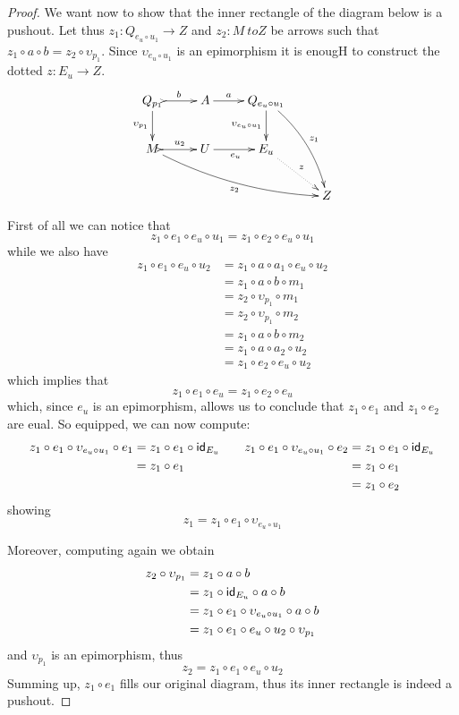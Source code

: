 \begin{proof}
	We want now to show that the inner rectangle of the diagram below is a pushout.  Let thus $z_1\colon Q_{e_u\circ u_1}\to Z$ and $z_2\colon M\ to Z$ be arrows such that $z_1\circ a\circ b=z_2\circ \upsilon_{p_1}$. Since $\upsilon_{e_u\circ u_1}$ is an epimorphism it is enougH to construct the dotted $z\colon E_u \to Z$. 
	\[\xymatrix{Q_{p_1} \ar@{>->}[r]^{b} \ar[d]_{\upsilon_{p_1}}& A \ar[r]^-{a}& Q_{e_u\circ u_1} \ar[d]_{\upsilon_{e_u\circ u_1}} \ar@/^.3cm/[ddr]^{z_1} \\M \ar@/_.3cm/[drrr]_{z_2}\ar@{>->}[r]^-{u_2}&U \ar[r]_{e_u}& E_u \ar@{.>}[dr]^{z}\\ & & & Z}\]
	
	First of all we can notice that
	\[z_1\circ e_1\circ e_u\circ u_1 = z_1\circ e_2\circ e_u\circ u_1\]
	while we also have
	\begin{align*}
		z_1\circ e_1\circ e_u\circ u_2 &= z_1\circ a\circ a_1\circ e_u\circ u_2\\&=z_1\circ a \circ b\circ m_1\\&=z_2\circ \upsilon_{p_1} \circ m_1
		\\&=z_2\circ \upsilon_{p_1} \circ m_2
		\\&=z_1\circ a \circ b\circ m_2 
		\\&=z_1\circ a\circ a_2\circ u_2
		\\&=z_1\circ e_2\circ e_u \circ u_2
	\end{align*}
	which implies that
	\[z_1\circ e_1\circ e_u  = z_1\circ e_2\circ e_u\]
	which, since $e_u$ is an epimorphism, allows us to conclude that $z_1\circ e_1$ and $z_1\circ e_2$ are eual. So equipped, we can now compute:
	\[\begin{split}
		z_1\circ e_1\circ \upsilon_{e_u\circ u_1}\circ e_1&=z_1\circ e_1\circ \mathsf{id}_{E_u}\\&=z_1\circ e_1\\&
	\end{split} \qquad \begin{split}
		z_1\circ e_1\circ \upsilon_{e_u\circ u_1}\circ e_2&=z_1\circ e_1\circ \mathsf{id}_{E_u}\\&=z_1\circ e_1\\&=z_1\circ e_2
	\end{split}\]
	showing 
	\[z_1=z_1\circ e_1 \circ  \upsilon_{e_u\circ u_1}\]
	
	Moreover, computing again we obtain
	\begin{align*}
		z_2\circ \upsilon_{p_1}&=z_1\circ a \circ b \\&=z_1\circ \mathsf{id}_{E_u} \circ a \circ b\\&=z_1\circ e_1 \circ \upsilon_{e_u\circ u_1} \circ a\circ b\\&=z_1\circ e_1\circ e_u\circ u_2 \circ \upsilon_{p_1} 
	\end{align*}
	and $\upsilon_{p_1}$ is an epimorphism, thus
	\[z_2=z_1\circ e_1\circ e_u \circ u_2\]
	Summing up, $z_1\circ e_1$ fills our original diagram, thus its inner rectangle is indeed a pushout.
	

\end{proof}
